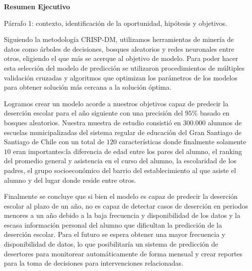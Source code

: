     \begin{center}
        \vspace*{1cm}
        
        \textbf{Resumen Ejecutivo}
        
        \vspace{0.5cm}
        
    \end{center}


Párrafo 1: contexto, identificación de la oportunidad, hipótesis y objetivos.

Siguiendo la metodología CRISP-DM, utilizamos herramientas de minería de datos como árboles de decisiones, bosques aleatorios y redes neuronales entre otros, eligiendo el que más se acerque al objetivo de modelo. Para poder hacer esta selección del modelo de predicción se utilizaron procedimientos de múltiples validación cruzadas y algoritmos que optimizan los parámetros de los modelos para obtener solución más cercana a la solución óptima.

Logramos crear un modelo acorde a nuestros objetivos capaz de predecir la deserción escolar para el año siguiente con una precisión del $95$\% basado en bosques aleatorios. Nuestra muestra de estudio consistió en $300.000$ alumnos de escuelas municipalizadas del sistema regular de educación del Gran Santiago de Santiago de Chile con un total de $120$ características donde finalmente solamente $10$ eran importantes:la diferencia de edad entre los pares del alumno, el ranking del promedio general y asistencia en el curso del alumno, la escolaridad de los padres, el grupo socioeconómico del barrio del establecimiento al que asiste el alumno y del lugar donde reside entre otros. 

Finalmente se concluye que si bien el modelo es capaz de predecir la deserción escolar al plazo de un año, no es capaz de detectar casos de deserción en periodos menores a un año debido a la baja frecuencia y disponibilidad de los datos y la escasa información personal del alumno que dificultan la predicción de la deserción escolar. Para el futuro se espera obtener una mayor frecuencia y disponibilidad de datos, lo que posibilitaría un sistema de predicción de desertores para monitorear automáticamente de forma mensual y crear reportes para la toma de decisiones para intervenciones relacionadas.
